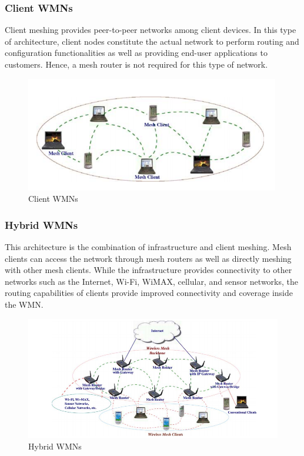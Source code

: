 \documentclass[12pt,a4paper]{report}
\begin{document}
\subsubsection{Client WMNs}
Client meshing provides peer-to-peer networks among client devices.
In this type of architecture, client nodes constitute the actual network to perform
routing and configuration functionalities as well as providing end-user applications to
customers. Hence, a mesh router is not required for this type of network.
\begin{figure}[hbtp]
\centering
\includegraphics[scale=1]{client-wmn.png}
\caption{Client WMNs}
\end{figure}


\subsubsection{Hybrid WMNs}
This architecture is the combination of infrastructure and client
meshing. Mesh clients can access the network through mesh
routers as well as directly meshing with other mesh clients. While the infrastructure
provides connectivity to other networks such as the Internet, Wi-Fi, WiMAX, cellular,
and sensor networks, the routing capabilities of clients provide improved connectivity
and coverage inside the WMN.
\begin{figure}[hbtp]
\centering
\includegraphics[scale=0.75]{hybrid-wmn.png}
\caption{Hybrid WMNs}
\end{figure}
\end{document}
